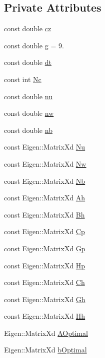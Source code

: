 \subsection*{\-Private \-Attributes}
\begin{DoxyCompactItemize}
\item 
const double \hyperlink{classZmpPreviewController_a3a317d26cc1bbaf8811491724fdd1def}{cz}
\item 
const double \hyperlink{classZmpPreviewController_a344571f012aa58250d7625905681bf1b}{g} = 9.
\item 
const double \hyperlink{classZmpPreviewController_abf1a3ec8d1698afab1c20bba32b5a724}{dt}
\item 
const int \hyperlink{classZmpPreviewController_af0c8b4aa92a6e3e95f80d81a8c91f693}{\-Nc}
\item 
const double \hyperlink{classZmpPreviewController_ac611f084023404faba1ccfab573cd81d}{nu}
\item 
const double \hyperlink{classZmpPreviewController_a783427b817d77469e1f80426bede5310}{nw}
\item 
const double \hyperlink{classZmpPreviewController_a6716ee4c94e6f91e608ee1e29fbc7051}{nb}
\item 
const \-Eigen\-::\-Matrix\-Xd \hyperlink{classZmpPreviewController_ac3e92145988993ede7ce2060b997c8db}{\-Nu}
\item 
const \-Eigen\-::\-Matrix\-Xd \hyperlink{classZmpPreviewController_a5e85354a1a7c3f2a8e265dbe7367051c}{\-Nw}
\item 
const \-Eigen\-::\-Matrix\-Xd \hyperlink{classZmpPreviewController_abd345d397e99ae01ad4ea80cd9894802}{\-Nb}
\item 
const \-Eigen\-::\-Matrix\-Xd \hyperlink{classZmpPreviewController_a8ee8ec415e25374f4fa687f5a5a6b9df}{\-Ah}
\item 
const \-Eigen\-::\-Matrix\-Xd \hyperlink{classZmpPreviewController_a98bd07d03d0a6004b345ef4310cf17b6}{\-Bh}
\item 
const \-Eigen\-::\-Matrix\-Xd \hyperlink{classZmpPreviewController_a1a63870dcc3d51a26c4adc9c97e650ff}{\-Cp}
\item 
const \-Eigen\-::\-Matrix\-Xd \hyperlink{classZmpPreviewController_a53a7d8af5be4a5d5cea99fad2ea48979}{\-Gp}
\item 
const \-Eigen\-::\-Matrix\-Xd \hyperlink{classZmpPreviewController_a32ab17a3be30490e4a1e874bf3581843}{\-Hp}
\item 
const \-Eigen\-::\-Matrix\-Xd \hyperlink{classZmpPreviewController_a2093754713ffb2a7adcd1310c73bf775}{\-Ch}
\item 
const \-Eigen\-::\-Matrix\-Xd \hyperlink{classZmpPreviewController_a9429cb06fdd2c3ca5036a2fd48303632}{\-Gh}
\item 
const \-Eigen\-::\-Matrix\-Xd \hyperlink{classZmpPreviewController_a8caaf8bf8f06e5b0b53d2cd5c131eefd}{\-Hh}
\item 
\-Eigen\-::\-Matrix\-Xd \hyperlink{classZmpPreviewController_a2afe60ed4923414ce4e51a8a7a584fde}{\-A\-Optimal}
\item 
\-Eigen\-::\-Matrix\-Xd \hyperlink{classZmpPreviewController_a049829dccbeb5a7a1bf47f7e6679174a}{b\-Optimal}
\end{DoxyCompactItemize}


